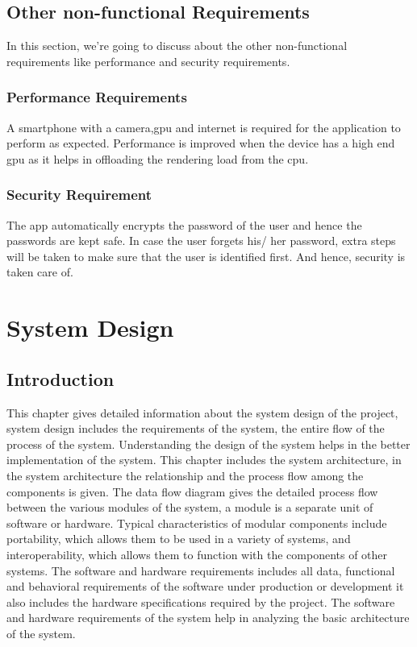 \documentclass[BTech]{srmuthesis}
\begin{document}
\section{Other non-functional Requirements}
In this section, we're going to discuss about the other non-functional requirements like performance and security requirements. 
\subsection{Performance Requirements}
A smartphone with a camera,gpu and internet is required for the application to perform as expected. Performance is improved when the device has a high end gpu as it helps in offloading the rendering load from the cpu.
\subsection{Security Requirement}
The app automatically encrypts the password of the user and hence the passwords are kept safe. In case the user forgets his/ her password, extra steps will be taken to make sure that the user is identified first. And hence, security is taken care of.
\chapter{System Design}
\section{Introduction}
This chapter gives detailed information about the system design of the project, system design includes the requirements of the system, the entire flow of the process of the system. Understanding the design of the system helps in the better implementation of the system. This chapter includes the system architecture, in the system architecture the relationship and the process flow among the components is given. The data flow diagram gives the detailed process flow between the various modules of the system, a module is a separate unit of software or hardware. Typical characteristics of modular components include portability, which allows them to be used in a variety of systems, and interoperability, which allows them to function with the components of other systems. The  software and hardware requirements includes all data, functional and behavioral requirements of the software under production or development it also includes the hardware specifications required by the project. The software and hardware requirements of the system help in analyzing the basic architecture of the system. 
\end{document}

